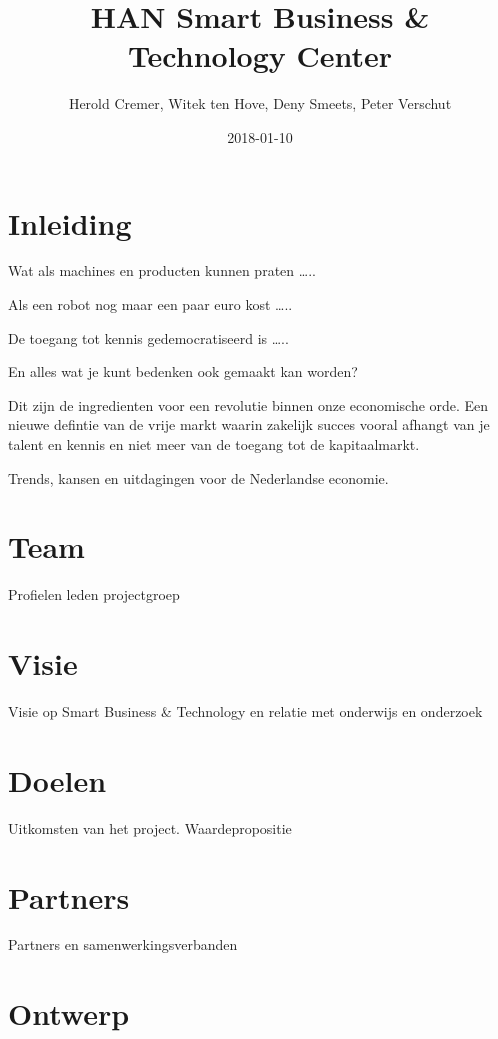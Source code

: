 \documentclass[]{book}
\title{HAN Smart Business \& Technology Center}
\author{Herold Cremer, Witek ten Hove, Deny Smeets, Peter Verschut}
\date{2018-01-10}
\begin{document}
\maketitle

{
\setcounter{tocdepth}{1}
\tableofcontents
}
\chapter{Inleiding}\label{inleiding}

Wat als machines en producten kunnen praten \ldots{}..

Als een robot nog maar een paar euro kost \ldots{}..

De toegang tot kennis gedemocratiseerd is \ldots{}..

En alles wat je kunt bedenken ook gemaakt kan worden?

Dit zijn de ingredienten voor een revolutie binnen onze economische
orde. Een nieuwe defintie van de vrije markt waarin zakelijk succes
vooral afhangt van je talent en kennis en niet meer van de toegang tot
de kapitaalmarkt.

Trends, kansen en uitdagingen voor de Nederlandse economie.

\chapter{Team}\label{team}

Profielen leden projectgroep

\chapter{Visie}\label{visie}

Visie op Smart Business \& Technology en relatie met onderwijs en
onderzoek

\chapter{Doelen}\label{doelen}

Uitkomsten van het project. Waardepropositie

\chapter{Partners}\label{partners}

Partners en samenwerkingsverbanden

\chapter{Ontwerp}\label{ontwerp}
\end{document}
